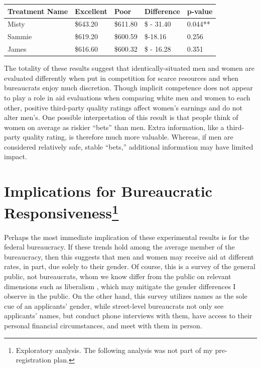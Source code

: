 \documentclass[12pt]{article}%
\begin{document}
\begin{doublespace}
\begin{table}[]
	\label{lasttable}
	\centering
	\begin{tabular}{lllll}
		\textbf{Treatment Name}      & \textbf{Excellent}            & \textbf{Poor}                 & \textbf{Difference}             & \textbf{p-value}           \\ \hline
		\multicolumn{1}{|l|}{Misty}  & \multicolumn{1}{l|}{\$643.20} & \multicolumn{1}{l|}{\$611.80} & \multicolumn{1}{l|}{\$ - 31.40} & \multicolumn{1}{l|}{0.044**} \\ \hline
		\multicolumn{1}{|l|}{Sammie} & \multicolumn{1}{l|}{\$619.20} & \multicolumn{1}{l|}{\$600.59} & \multicolumn{1}{l|}{\$-18.16}   & \multicolumn{1}{l|}{0.256} \\ \hline
		\multicolumn{1}{|l|}{James}  & \multicolumn{1}{l|}{\$616.60} & \multicolumn{1}{l|}{\$600.32} & \multicolumn{1}{l|}{\$ - 16.28} & \multicolumn{1}{l|}{0.351} \\ \hline
	\end{tabular}
\end{table}


The totality of these results suggest that identically-situated men and women are evaluated differently when put in competition for scarce resources and when bureaucrats enjoy much discretion. Though implicit competence does not appear to play a role in aid evaluations when comparing white men and women to each other, positive third-party quality ratings affect women’s earnings and do not alter men’s. One possible interpretation of this result is that people think of women on average as riskier ``bets” than men. Extra information, like a third-party quality rating, is therefore much more valuable. Whereas, if men are considered relatively safe, stable ``bets,” additional information may have limited impact.

\section*{Implications for Bureaucratic Responsiveness\footnote{Exploratory analysis. The following analysis was not part of my pre-registration plan.}}
Perhaps the most immediate implication of these experimental results is for the federal bureaucracy. If these trends hold among the average member of the bureaucracy, then this suggests that men and women may receive aid at different rates, in part, due solely to their gender. Of course, this is a survey of the general public, not bureaucrats, whom we know differ from the public on relevant dimensions such as liberalism \citep{spenkuch_ideology_2021}, which may mitigate the gender differences I observe in the public. On the other hand, this survey utilizes names as the sole cue of an applicants’ gender, while street-level bureaucrats not only see applicants’ names, but conduct phone interviews with them, have access to their personal financial circumstances, and meet with them in person.


\end{doublespace}
\end{document}
